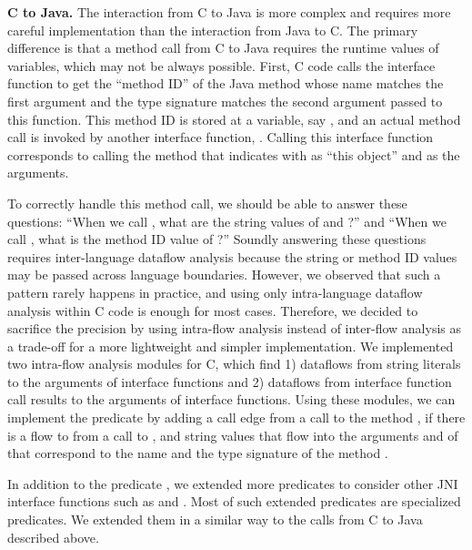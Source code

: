 \textbf{C to Java.} The interaction from C to Java is more complex and
requires more careful implementation than the interaction from Java to C.
The primary difference is that a method call from C to Java requires
the runtime values of variables, which may not be always possible.
First, C code calls the interface function 
to get the ``method ID'' of the Java method whose name matches the first argument
and the type signature matches the second argument passed to this function.
This method ID is stored at a variable, say , and
an actual method call is invoked by another
interface function, . Calling this interface 
function corresponds to calling the method that  indicates
with  as ``this object'' and  as the arguments.

To correctly handle this method call, we should be able to answer these
questions: ``When we call ,
what are the string values of  and ?'' and
``When we call , what is the method ID value of ?''
Soundly answering these questions requires inter-language dataflow analysis
because the string or method ID values may be passed across language boundaries.
However, we observed that such a pattern rarely happens in practice,
and using only intra-language dataflow analysis within C code is enough for most cases.
Therefore, we decided to sacrifice the precision
by using intra-flow analysis instead of inter-flow analysis
as a trade-off for a more lightweight and simpler implementation.
We implemented two intra-flow analysis modules for C,
which find 1) dataflows from string literals to the arguments of interface functions
and 2) dataflows from interface function call results to the arguments of interface functions.
Using these modules, we can implement the
predicate  by adding a call edge from a 
call to the method , if there is a flow to  from a
call to , and string values that flow into the
arguments  and  of  that
correspond to the name and the type signature of the method .

In addition to the predicate ,
we extended more predicates to consider other JNI interface functions such as
 and .
Most of such extended predicates are specialized  predicates.
We extended them in a similar way to the calls from C to Java described above.

